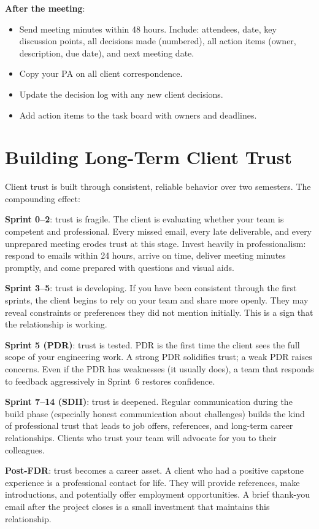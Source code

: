 \textbf{After the meeting}:
\begin{itemize}[nosep,leftmargin=1.5em]
\item Send meeting minutes within 48 hours. Include: attendees, date, key discussion points, all decisions made (numbered), all action items (owner, description, due date), and next meeting date.
\item Copy your PA on all client correspondence.
\item Update the decision log with any new client decisions.
\item Add action items to the task board with owners and deadlines.
\end{itemize}



\section{Building Long-Term Client Trust}
Client trust is built through consistent, reliable behavior over two semesters. The compounding effect:

\textbf{Sprint 0--2}: trust is fragile. The client is evaluating whether your team is competent and professional. Every missed email, every late deliverable, and every unprepared meeting erodes trust at this stage. Invest heavily in professionalism: respond to emails within 24 hours, arrive on time, deliver meeting minutes promptly, and come prepared with questions and visual aids.

\textbf{Sprint 3--5}: trust is developing. If you have been consistent through the first sprints, the client begins to rely on your team and share more openly. They may reveal constraints or preferences they did not mention initially. This is a sign that the relationship is working.

\textbf{Sprint 5 (PDR)}: trust is tested. PDR is the first time the client sees the full scope of your engineering work. A strong PDR solidifies trust; a weak PDR raises concerns. Even if the PDR has weaknesses (it usually does), a team that responds to feedback aggressively in Sprint~6 restores confidence.

\textbf{Sprint 7--14 (SDII)}: trust is deepened. Regular communication during the build phase (especially honest communication about challenges) builds the kind of professional trust that leads to job offers, references, and long-term career relationships. Clients who trust your team will advocate for you to their colleagues.

\textbf{Post-FDR}: trust becomes a career asset. A client who had a positive capstone experience is a professional contact for life. They will provide references, make introductions, and potentially offer employment opportunities. A brief thank-you email after the project closes is a small investment that maintains this relationship.

